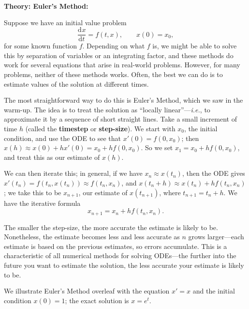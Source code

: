 \documentclass{article}
\newcommand{\deriv}[3][]{\frac{\mathrm{d}^{#1}#2}{\mathrm{d}#3^{#1}}}
\begin{document}
\clearpage














\textbf{Theory: Euler's Method:}

\bigskip

Suppose we have an initial value problem
\[\deriv{x}{t}=f(t,x),\qquad x(0)=x_0,\]
for some known function $f$. Depending on what $f$ is, we might be able to solve this by separation of variables or an integrating factor, and these methods do work for several equations that arise in real-world problems. However, for many problems, neither of these methods works. Often, the best we can do is to estimate values of the solution at different times.

The most straightforward way to do this is Euler's Method, which we saw in the warm-up. The idea is to treat the solution as ``locally linear''---\textit{i.e.}, to approximate it by a sequence of short straight lines. Take a small increment of time $h$ (called the \textbf{timestep} or \textbf{step-size}). We start with $x_0$, the initial condition, and use the ODE to see that $x'(0)=f(0,x_0)$; then $x(h)\approx x(0)+hx'(0)=x_0+hf(0,x_0)$. So we set $x_1=x_0+hf(0,x_0)$, and treat this as our estimate of $x(h)$.

We can then iterate this; in general, if we have $x_n\approx x(t_n)$, then the ODE gives $x'(t_n)=f(t_n,x(t_n))\approx f(t_n,x_n)$, and $x(t_n+h)\approx x(t_n)+hf(t_n,x_n)$; we take this to be $x_{n+1}$, our estimate of $x(t_{n+1})$, where $t_{n+1}=t_n+h$. We have the iterative formula
\[x_{n+1}=x_n+hf(t_n,x_n).\]

The smaller the step-size, the more accurate the estimate is likely to be. Nonetheless, the estimate becomes less and less accurate as $n$ grows larger---each estimate is based on the previous estimates, so errors accumulate. This is a characteristic of all numerical methods for solving ODEs---the further into the future you want to estimate the solution, the less accurate your estimate is likely to be.

We illustrate Euler's Method overleaf with the equation $x'=x$ and the initial condition $x(0)=1$; the exact solution is $x=e^t$.
\end{document}
